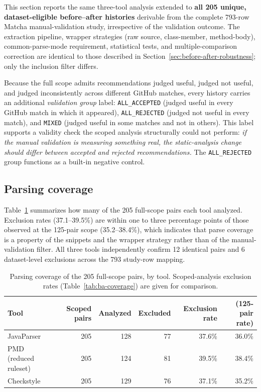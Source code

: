 This section reports the same three-tool analysis extended to \textbf{all 205 unique, dataset-eligible before--after histories} derivable from the complete 793-row Matcha manual-validation study, irrespective of the validation outcome.
The extraction pipeline, wrapper strategies (raw source, class-member, method-body), common-parse-mode requirement, statistical tests, and multiple-comparison correction are identical to those described in Section~\ref{sec:before-after-robustness}; only the inclusion filter differs.

Because the full scope admits recommendations judged useful, judged not useful, and judged inconsistently across different GitHub matches, every history carries an additional \emph{validation group} label: \texttt{ALL\_ACCEPTED} (judged useful in every GitHub match in which it appeared), \texttt{ALL\_REJECTED} (judged not useful in every match), and \texttt{MIXED} (judged useful in some matches and not in others).
This label supports a validity check the scoped analysis structurally could not perform: \emph{if the manual validation is measuring something real, the static-analysis change should differ between accepted and rejected recommendations.}
The \texttt{ALL\_REJECTED} group functions as a built-in negative control.

\subsection{Parsing coverage}
\label{sec:ba-full-coverage}

Table~\ref{tab:ba-full-coverage} summarizes how many of the 205 full-scope pairs each tool analyzed.
Exclusion rates (37.1--39.5\%) are within one to three percentage points of those observed at the 125-pair scope (35.2--38.4\%), which indicates that parse coverage is a property of the snippets and the wrapper strategy rather than of the manual-validation filter.
All three tools independently confirm 12 identical pairs and 6 dataset-level exclusions across the 793 study-row mapping.

\begin{table}[htbp]
\centering
\caption{Parsing coverage of the 205 full-scope pairs, by tool.
Scoped-analysis exclusion rates (Table~\ref{tab:ba-coverage}) are given for comparison.}
\label{tab:ba-full-coverage}
\begin{tabular}{lrrrrr}
\toprule
Tool & Scoped pairs & Analyzed & Excluded & Exclusion rate & (125-pair rate) \\
\midrule
JavaParser            & 205 & 128 & 77 & 37.6\% & 36.0\% \\
PMD (reduced ruleset) & 205 & 124 & 81 & 39.5\% & 38.4\% \\
Checkstyle            & 205 & 129 & 76 & 37.1\% & 35.2\% \\
\bottomrule
\end{tabular}
\end{table}

